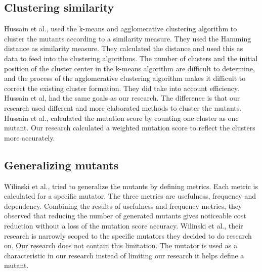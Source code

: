 \documentclass[../main]{subfiles}
\begin{document}
\subsection{Clustering similarity}
Hussain et al., used the k-means and agglomerative clustering algorithm to cluster the mutants according to a similarity measure. 
They used the Hamming distance as similarity measure.
They calculated the distance and used this as data to feed into the clustering algorithms.
The number of clusters and the initial position of the cluster center in the k-means algorithm are difficult to determine, and the process of the agglomerative clustering algorithm makes it difficult to correct the existing cluster formation\cite{Hussain2008}.
They did take into account efficiency.
Hussain et al, had the same goals as our research. 
The difference is that our research used different and more elaborated methods to cluster the mutants.
Hussain et al., calculated the mutation score by counting one cluster as one mutant.
Our research calculated a weighted mutation score to reflect the clusters more accurately.

\subsection{Generalizing mutants}
Wilinski et al., tried to generalize the mutants by defining metrics.
Each metric is calculated for a specific mutator.
The three metrics are usefulness, frequency and dependency.
Combining the results of usefulness and frequency metrics, they observed that reducing the number of generated mutants gives noticeable cost reduction without a loss of the mutation score accuracy.
Wilinski et al., their research is narrowly scoped to the specific mutators they decided to do research on.
Our research does not contain this limitation.
The mutator is used as a characteristic in our research instead of limiting our research it helps define a mutant.
\end{document}
